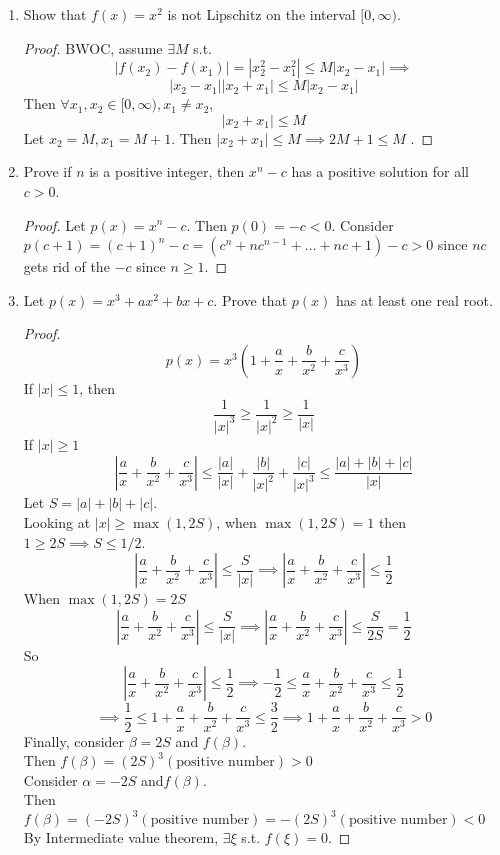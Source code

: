 \documentclass[14pt]{extarticle}
\begin{document}
\begin{enumerate}
		\item Show that $f(x) = x^2$ is not Lipschitz on the interval $[0,\infty)$.
		\begin{proof}
			BWOC, assume $\exists M$ s.t.
			\[|f(x_2) - f(x_1)| = |x_2^2 - x_1^2| \leq M|x_2-x_1| \implies\]
			\[|x_2-x_1||x_2+x_1| \leq M|x_2-x_1|\]
			Then $\forall x_1,x_2\in[0,\infty), x_1 \neq x_2$,
			\[|x_2+x_1| \leq M\]
			Let $x_2 = M, x_1 = M+1$. Then $|x_2 + x_1|\leq M \implies 2M+1 \leq M$ \contra.
		\end{proof}
		
		\item Prove if $n$ is a positive integer, then $x^n-c$ has a positive solution for all $c>0$.
		\begin{proof}
			Let $p(x) = x^n-c$. Then $p(0) = -c<0$. Consider $p(c+1) = (c+1)^n-c = (c^n +nc^{n-1}+\ldots+nc+1) - c >0$ since $nc$ gets rid of the $-c$ since $n\geq1$.
		\end{proof}
		
		\item Let $p(x) = x^3 + ax^2 + bx +c$. Prove that $p(x)$ has at least one real root.
		\begin{proof}
			\[p(x) = x^3(1+\frac{a}{x}+\frac{b}{x^2}+\frac{c}{x^3})\]
			If $|x|\leq1$, then
			\[\frac{1}{|x|^3} \geq \frac{1}{|x|^2} \geq \frac{1}{|x|}\]
			If $|x| \geq 1$
			\[|\frac{a}{x} + \frac{b}{x^2} + \frac{c}{x^3}| \leq \frac{|a|}{|x|} + \frac{|b|}{|x|^2} + \frac{|c|}{|x|^3} \leq \frac{|a|+|b|+|c|}{|x|}\]
			Let $S = |a|+|b|+|c|$.\\
			Looking at $|x| \geq \max(1,2S)$, when $\max(1,2S) = 1$ then $1\geq2S \implies S \leq 1/2$.
			\[|\frac{a}{x} + \frac{b}{x^2} + \frac{c}{x^3}| \leq \frac{S}{|x|} \implies |\frac{a}{x} + \frac{b}{x^2} + \frac{c}{x^3}| \leq \frac{1}{2}\]
			When $\max(1,2S) = 2S$
			\[|\frac{a}{x} + \frac{b}{x^2} + \frac{c}{x^3}| \leq \frac{S}{|x|} \implies |\frac{a}{x} + \frac{b}{x^2} + \frac{c}{x^3}| \leq \frac{S}{2S} = \frac{1}{2}\]
			So
			\[|\frac{a}{x} + \frac{b}{x^2} + \frac{c}{x^3}| \leq  \frac{1}{2} \implies -\frac{1}{2} \leq \frac{a}{x} + \frac{b}{x^2} + \frac{c}{x^3} \leq  \frac{1}{2}\]
			\[\implies \frac{1}{2} \leq 1 + \frac{a}{x} + \frac{b}{x^2} + \frac{c}{x^3} \leq  \frac{3}{2} \implies 1 + \frac{a}{x} + \frac{b}{x^2} + \frac{c}{x^3} > 0\]
			Finally, consider $\beta=2S$ and $f(\beta)$.\\
			Then $f(\beta) = (2S)^3(\text{positive number}) > 0$\\
			Consider $\alpha = -2S$ and$f(\beta)$.\\
			Then $f(\beta) = (-2S)^3(\text{positive number}) = -(2S)^3(\text{positive number})< 0$\\
			By Intermediate value theorem, $\exists \xi$ s.t. $f(\xi) = 0$.
		\end{proof}
	\end{enumerate}
\end{document}
